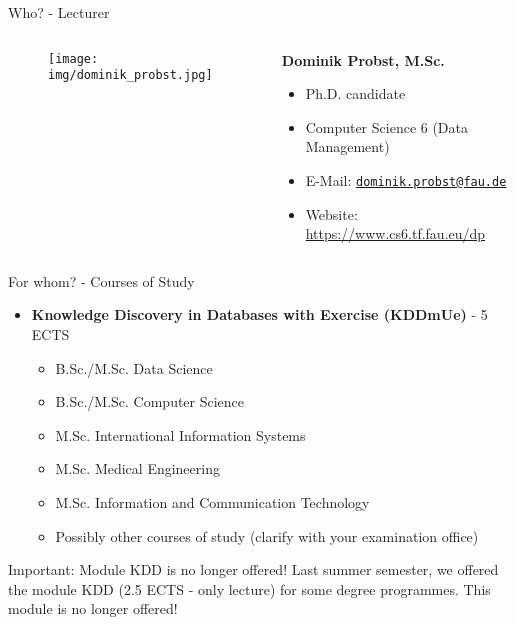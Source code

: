 \begin{frame}{Who? - Lecturer}

	\begin{columns}[T]
		\begin{column}{0.2\textwidth}
			\vspace{-1em}
			\begin{figure}[t]
				\centering
				\texttt{[image: img/dominik\_probst.jpg]}
			\end{figure}
		\end{column}
		\begin{column}{0.8\textwidth}
			\textbf{Dominik Probst, M.Sc.}
			\begin{itemize}
				\item Ph.D. candidate
				\item Computer Science 6 (Data Management)
				\item E-Mail: \texttt{\href{mailto:dominik.probst@fau.de}{dominik.probst@fau.de}}
				\item Website: \url{https://www.cs6.tf.fau.eu/dp}
			\end{itemize}
		\end{column}
	\end{columns}
\end{frame}

\begin{frame}{For whom? - Courses of Study}
	\begin{itemize}
		\item \textbf{Knowledge Discovery in Databases with Exercise (KDDmUe)} - 5 ECTS
		      \begin{itemize}
			      \item B.Sc./M.Sc. Data Science
			      \item B.Sc./M.Sc. Computer Science
			      \item M.Sc. International Information Systems
			      \item M.Sc. Medical Engineering
			      \item M.Sc. Information and Communication Technology
			      \item {\color{gray} Possibly other courses of study (clarify with your examination office)}
		      \end{itemize}
	\end{itemize}

	\begin{alertblock}{Important: Module KDD is no longer offered!}
		Last summer semester, we offered the module KDD (2.5 ECTS - only lecture) for some degree programmes. This module is no longer offered!
	\end{alertblock}

\end{frame}

